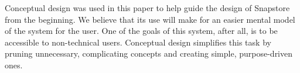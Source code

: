 Conceptual design was used in this paper to help guide the design of Snapstore from the beginning. We believe that its use will make for an easier mental model of the system for the user. One of the goals of this system, after all, is to be accessible to non-technical users. Conceptual design simplifies this task by pruning unnecessary, complicating concepts and creating simple, purpose-driven ones.



